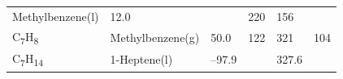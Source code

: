 \documentclass[
  9pt,
]{extbook}
\theoremstyle{definition}
\theoremstyle{definition}
\theoremstyle{definition}
\theoremstyle{remark}
\begin{document}
\begin{longtable}[]{@{}llllll@{}}
\begin{minipage}[t]{0.17\columnwidth}
Methylbenzene(l)\strut
\end{minipage} & \begin{minipage}[t]{0.15\columnwidth}\raggedright
12.0\strut
\end{minipage} & \begin{minipage}[t]{0.15\columnwidth}\raggedright
\strut
\end{minipage} & \begin{minipage}[t]{0.14\columnwidth}\raggedright
220\strut
\end{minipage} & \begin{minipage}[t]{0.14\columnwidth}\raggedright
156\strut
\end{minipage}\tabularnewline
\begin{minipage}[t]{0.07\columnwidth}\raggedright
C\textsubscript{7}H\textsubscript{8}\strut
\end{minipage} & \begin{minipage}[t]{0.17\columnwidth}\raggedright
Methylbenzene(g)\strut
\end{minipage} & \begin{minipage}[t]{0.15\columnwidth}\raggedright
50.0\strut
\end{minipage} & \begin{minipage}[t]{0.15\columnwidth}\raggedright
122\strut
\end{minipage} & \begin{minipage}[t]{0.14\columnwidth}\raggedright
321\strut
\end{minipage} & \begin{minipage}[t]{0.14\columnwidth}\raggedright
104\strut
\end{minipage}\tabularnewline
\begin{minipage}[t]{0.07\columnwidth}\raggedright
C\textsubscript{7}H\textsubscript{14}\strut
\end{minipage} & \begin{minipage}[t]{0.17\columnwidth}\raggedright
1-Heptene(l)\strut
\end{minipage} & \begin{minipage}[t]{0.15\columnwidth}\raggedright
--97.9\strut
\end{minipage} & \begin{minipage}[t]{0.15\columnwidth}\raggedright
\strut
\end{minipage} & \begin{minipage}[t]{0.14\columnwidth}\raggedright
327.6\strut
\end{minipage} & \begin{minipage}[t]{0.14\columnwidth}\raggedright

\end{minipage}
\end{longtable}
\end{document}

